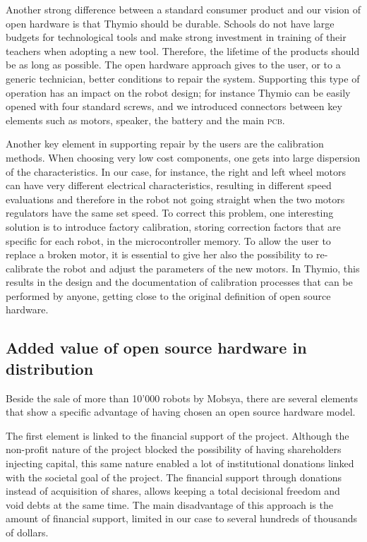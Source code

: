 \documentclass[letterpaper, 10 pt, conference]{ieeeconf}  %
\begin{document}
Another strong difference between a standard consumer product and our vision of open hardware is that Thymio should be durable.
Schools do not have large budgets for technological tools and make strong investment in training of their teachers when adopting a new tool.
Therefore, the lifetime of the products should be as long as possible. 
The open hardware approach gives to the user, or to a generic technician, better conditions to repair the system.
Supporting this type of operation has an impact on the robot design; for instance Thymio can be easily opened with four standard screws, and we introduced connectors between key elements such as motors, speaker, the battery and the main \textsc{pcb}.

Another key element in supporting repair by the users are the calibration methods. 
When choosing very low cost components, one gets into large dispersion of the characteristics. 
In our case, for instance, the right and left wheel motors can have very different electrical characteristics, resulting in different speed evaluations and therefore in the robot not going straight when the two motors regulators have the same set speed.
To correct this problem, one interesting solution is to introduce factory calibration, storing correction factors that are specific for each robot, in the microcontroller memory. 
To allow the user to replace a broken motor, it is essential to give her also the possibility to re-calibrate the robot and adjust the parameters of the new motors.
In Thymio, this results in the design and the documentation of calibration processes that can be performed by anyone, getting close to the original definition of open source hardware.

\subsection{Added value of open source hardware in distribution}

Beside the sale of more than 10'000 robots by Mobsya, there are several elements that show a specific advantage of having chosen an open source hardware model.

The first element is linked to the financial support of the project.
Although the non-profit nature of the project blocked the possibility of having shareholders injecting capital, this same nature enabled a lot of institutional donations linked with the societal goal of the project.
The financial support through donations instead of acquisition of shares, allows keeping a total decisional freedom and void debts at the same time.
The main disadvantage of this approach is the amount of financial support, limited in our case to several hundreds of thousands of dollars. 
\end{document}
